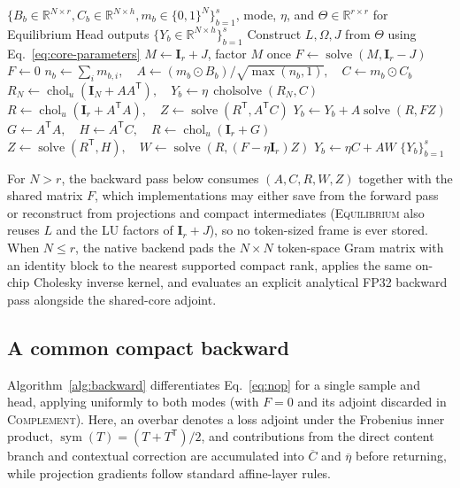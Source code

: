\documentclass[10pt,twocolumn]{article}
\let\draftsmall\small
\renewcommand{\small}{\draftsmall\fontsize{9}{10}\selectfont}
\newcommand{\R}{\mathbb{R}}
\newcommand{\I}{\mathbf{I}}
\newcommand{\T}{\mathsf{T}}
\newcommand{\sym}{\operatorname{sym}}
\newcommand{\Solve}{\operatorname{solve}}
\newcommand{\Chol}{\operatorname{chol}_{u}}
\newcommand{\CholSolve}{\operatorname{cholsolve}}
\begin{document}
\begin{algorithm}[!ht]
\caption{MemSolve forward without materializing $P$ (one head)}
\label{alg:forward}
\small
\begin{algorithmic}[1]
\Require $\{B_b\in\R^{N\times r},C_b\in\R^{N\times h},m_b\in\{0,1\}^N\}_{b=1}^{s}$,
 mode, $\eta$, and $\Theta\in\R^{r\times r}$ for Equilibrium
\Ensure Head outputs $\{Y_b\in\R^{N\times h}\}_{b=1}^{s}$
  \State Construct $L,\Omega,J$ from $\Theta$ using Eq.~\eqref{eq:core-parameters}
  \State $M\gets\I_r+J$, factor $M$ once
  \State $F\gets\Solve(M,\I_r-J)$ 
\Else
  \State $F\gets0$ 
\EndIf
{}
  \State $n_b\gets\sum_i m_{b,i},\quad A\gets(m_b\odot B_b)/\sqrt{\max(n_b,1)},\quad C\gets m_b\odot C_b$
   
    \State $R_N\gets\Chol(\I_N+AA^\T),\quad Y_b\gets\eta\,\CholSolve(R_N,C)$
      \State $R\gets\Chol(\I_r+A^\T A),\quad Z\gets\Solve(R^\T,A^\T C)$
      \State $Y_b\gets Y_b+A\Solve(R,FZ)$
    \EndIf
  \Else
    \State $G\gets A^\T A,\quad H\gets A^\T C,\quad R\gets\Chol(\I_r+G)$
    \State $Z\gets\Solve(R^\T,H),\quad W\gets\Solve(R,(F-\eta\I_r)Z)$
    \State $Y_b\gets\eta C+AW$
  \EndIf
\EndFor
\State \Return $\{Y_b\}_{b=1}^{s}$
\end{algorithmic}
\end{algorithm}

For $N>r$, the backward pass below consumes $(A,C,R,W,Z)$ together with the
shared matrix $F$, which implementations may either save from the forward
pass or reconstruct from projections and compact intermediates
(\textsc{Equilibrium} also reuses $L$ and the LU factors of $\I_r+J$), so no
token-sized frame is ever stored.
When $N\le r$, the native backend pads the $N\times N$ token-space Gram matrix
with an identity block to the nearest supported compact rank, applies the same
on-chip Cholesky inverse kernel, and evaluates an explicit analytical FP32
backward pass alongside the shared-core adjoint.

\subsection{A common compact backward}
\label{app:backward}

Algorithm~\ref{alg:backward} differentiates Eq.~\eqref{eq:nop} for a single
sample and head, applying uniformly to both modes (with $F=0$ and its adjoint
discarded in \textsc{Complement}).
Here, an overbar denotes a loss adjoint under the Frobenius inner product,
$\sym(T)=(T+T^\T)/2$, and contributions from the direct content branch and
contextual correction are accumulated into $\overline C$ and $\overline\eta$
before returning, while projection gradients follow standard affine-layer rules.
\end{document}
